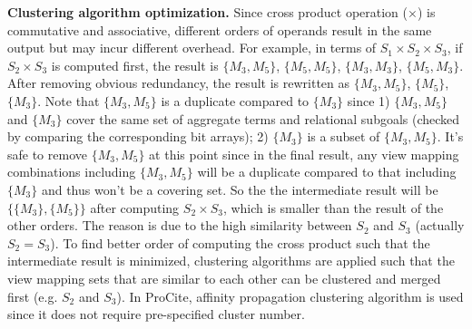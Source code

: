 \textbf{Clustering algorithm optimization.} Since cross product operation ($\times$) is commutative and associative, different orders of operands result in the same output but may incur different overhead. For example, in terms of $S_1\times S_2 \times S_3$, if $S_2 \times S_3$ is computed first, the result is $\{M_3, M_5\}$, $\{M_5, M_5\}$, $\{M_3, M_3\}$, $\{M_5, M_3\}$. After removing obvious redundancy, the result is rewritten as $\{M_3, M_5\}$, $\{M_5\}$, $\{M_3\}$. Note that $\{M_3, M_5\}$ is a duplicate compared to $\{M_3\}$ since 1) $\{M_3, M_5\}$ and $\{M_3\}$ cover the same set of aggregate terms and relational subgoals (checked by comparing the corresponding bit arrays); 2) $\{M_3\}$ is a subset of $\{M_3, M_5\}$. It's safe to remove $\{M_3, M_5\}$ at this point since in the final result, any view mapping combinations including $\{M_3, M_5\}$ will be a duplicate compared to that including $\{M_3\}$ and thus won't be a covering set. So the the intermediate result will be $\{\{M_3\}, \{M_5\}\}$ after computing $S_2 \times S_3$, which is smaller than the result of the other orders. The reason is due to the high similarity between $S_2$ and $S_3$ (actually $S_2 = S_3$). To find better order of computing the cross product such that the intermediate result is minimized, clustering algorithms are applied such that the view mapping sets that are similar to each other can be clustered and merged first (e.g. $S_2$ and $S_3$). In ProCite, affinity propagation clustering algorithm \cite{dueck2007non} is used since it does not require pre-specified cluster number.